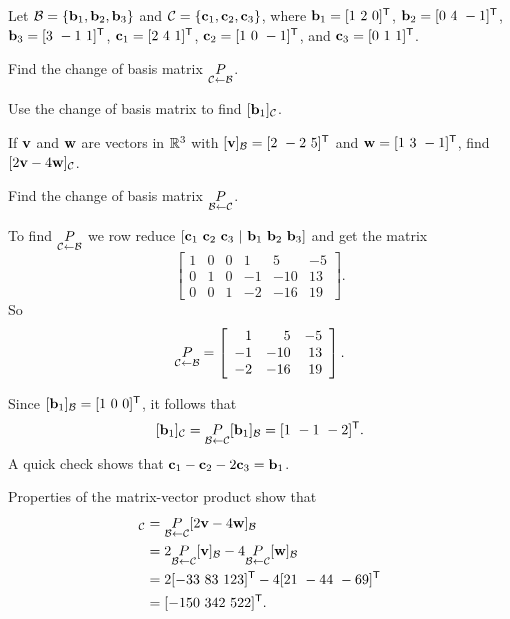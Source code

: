 \begin{example} Let $\mathcal{B} = \{\mathbf{b}_1, \mathbf{b}_2, \mathbf{b}_3\}$ and $\mathcal{C} = \{\mathbf{c}_1, \mathbf{c}_2, \mathbf{c}_3\}$, where $\mathbf{b}_1 = [1 \ 2 \ 0]^{\mathsf{T}}$, $\mathbf{b}_2 = [0 \ 4 \ -1]^{\mathsf{T}}$, $\mathbf{b}_3 = [3 \ -1 \ 1]^{\mathsf{T}}$, $\mathbf{c}_1 = [2 \ 4 \ 1]^{\mathsf{T}}$, $\mathbf{c}_2 = [1 \ 0 \ -1]^{\mathsf{T}}$, and $\mathbf{c}_3 = [0 \ 1 \ 1]^{\mathsf{T}}$. 
	\ba
	\item Find the change of basis matrix $\underset{\mathcal{C} \leftarrow \mathcal{B}}{P}$. 
	
	\item Use the change of basis matrix to find $[\mathbf{b}_1]_{\mathcal{C}}$. 
	
	\item If $\mathbf{v}$ and $\mathbf{w}$ are vectors in $\mathbb{R}^3$ with $[\mathbf{v}]_{\mathcal{B}} = [2 \ -2 \ 5]^{\mathsf{T}}$ and $\mathbf{w} = [ 1 \ 3 \ -1]^{\mathsf{T}}$, find $[2\mathbf{v}-4\mathbf{w}]_{\mathcal{C}}$. 
	
	\item Find the change of basis matrix $\underset{\mathcal{B} \leftarrow \mathcal{C}}{P}$. 
	\ea

\ExampleSolution

	\ba
	\item To find $\underset{\mathcal{C} \leftarrow \mathcal{B}}{P}$ we row reduce $[\mathbf{c}_1 \ \mathbf{c}_2 \ \mathbf{c}_3 \ | \ \mathbf{b}_1 \ \mathbf{b}_2 \ \mathbf{b}_3]$ and get the matrix 
	\[ \left[ \begin{array}{ccc|rrr} 1&0&0&1&5&-5\\ 0&1&0&-1&-10&13\\ 0&0&1&-2&-16&19 \end{array} \right].\]
	So
	\[ \underset{\mathcal{C} \leftarrow \mathcal{B}}{P} = \left[ \begin{array}{rrr} 1&5&-5\\ -1&-10&13\\ -2&-16&19 \end{array} \right].\]
	
	\item Since $[\vb_1]_{\CB} = [1 \ 0 \ 0]^{\tr}$, it follows that 
	\[[\mathbf{b}_1]_{\mathcal{C}} =  \underset{\mathcal{B} \leftarrow \mathcal{C}}{P} [\mathbf{b}_1]_{\mathcal{B}} = [1 \ -1 \ -2]^{\mathsf{T}}.\]
	A quick check shows that $\mathbf{c}_1-\mathbf{c}_2 - 2\mathbf{c}_3 = \mathbf{b}_1$. 
	
	\item Properties of the matrix-vector product show that 
	\begin{align*}
	[2\vv-4\vw]_{\CC} &= \underset{\CB \leftarrow \CC}{P}[2\vv-4\vw]_{\CB}  \\
		&= 2\underset{\CB \leftarrow \CC}{P}[\vv]_{\CB} -4\underset{\CB \leftarrow \CC}{P} [\vw]_{\CB}  \\
		&= 2[ -33 \ 83 \ 123]^{\tr} - 4[21 \ -44 \ -69]^{\tr} \\
		&= [-150 \ 342 \ 522]^{\tr}.
	\end{align*}
	

\end{example}
